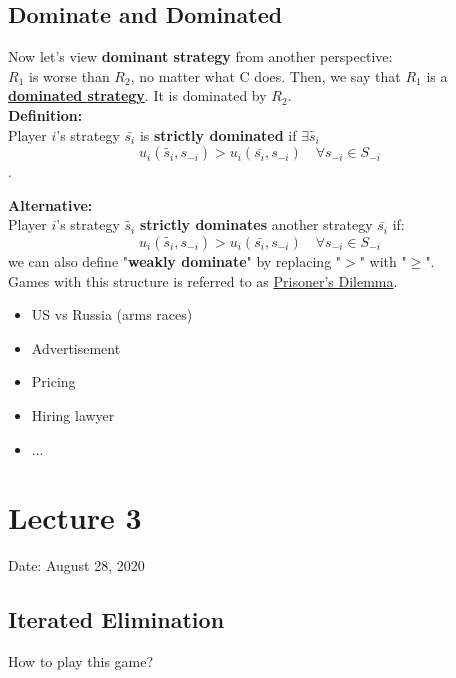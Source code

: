 \documentclass[12pt]{article}
\newcommand{\bb}[1]{{\textbf {#1}}}
\newcommand{\e}[1]{$ #1 $}
\newcommand{\ee}[1]{$$ #1 $$}
\begin{document}
\begin{spacing}{1.5}
        \subsection{Dominate and Dominated}

            Now let's view \bb{dominant strategy} from another perspective:\\
            \e{R_1} is worse than \e{R_2}, no matter what C does. Then, we say that \e{R_1} is 
            a \bb{\underline{dominated strategy}}. It is dominated by \e{R_2}.\\
            
            \bb{Definition:}\\
            Player \e{i}'s strategy \e{\bar{s_i}} is \bb{strictly dominated} if \e{\exists \tilde{s_i}}
            \ee{u_i(\tilde{s_i}, s_{-i}) > u_i(\bar{s_i}, s_{-i}) \quad \forall s_{-i} \in S_{-i}}.

            \bb{Alternative:}\\
            Player \e{i}'s strategy \e{\tilde{s_i}} \bb{strictly dominates} another strategy \e{\bar{s_i}} if:
            \ee{u_i(\tilde{s_i}, s_{-i}) > u_i(\bar{s_i}, s_{-i}) \quad \forall s_{-i} \in S_{-i}}
            we can also define "\bb{weakly dominate}" by replacing "\e{>}" with "\e{\ge}".\\

            Games with this structure is referred to as \underline{Prisoner's Dilemma}.
            \begin{itemize}
                \item US vs Russia (arms races)
                \item Advertisement
                \item Pricing
                \item Hiring lawyer
                \item ...

            \end{itemize}

    \newpage
    \section{Lecture 3}
        \begin{flushright}
            Date: August 28, 2020    
        \end{flushright}
        

        \subsection{Iterated Elimination}
            $$$$
            How to play this game?


\end{spacing}
\end{document}
